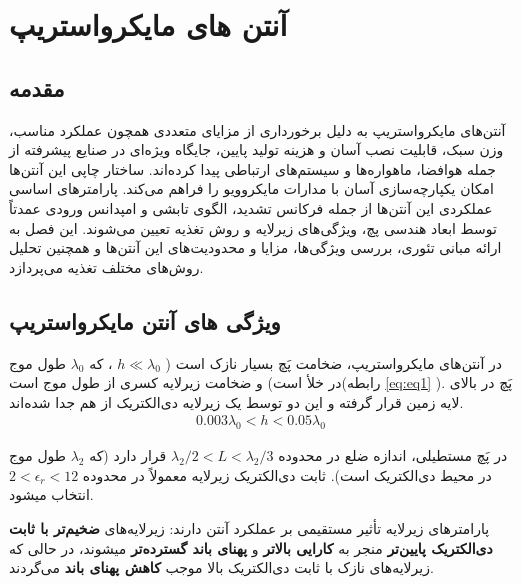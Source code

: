 \newpage 
\chapter{ آنتن های مایکرواستریپ}
\label{ch:1}

\section{مقدمه}
آنتن‌های مایکرواستریپ به دلیل برخورداری از مزایای متعددی همچون عملکرد مناسب، وزن سبک، قابلیت نصب آسان و هزینه تولید پایین، جایگاه ویژه‌ای در صنایع پیشرفته از جمله هوافضا، ماهواره‌ها و سیستم‌های ارتباطی پیدا کرده‌اند. ساختار چاپی این آنتن‌ها امکان یکپارچه‌سازی آسان با مدارات مایکروویو را فراهم می‌کند. پارامترهای اساسی عملکردی این آنتن‌ها از جمله فرکانس تشدید، الگوی تابشی و امپدانس ورودی عمدتاً توسط ابعاد هندسی پچ، ویژگی‌های زیرلایه و روش تغذیه تعیین می‌شوند. این فصل به ارائه مبانی تئوری، بررسی ویژگی‌ها، مزایا و محدودیت‌های این آنتن‌ها و همچنین تحلیل روش‌های مختلف تغذیه می‌پردازد.
\section{ویژگی های آنتن مایکرواستریپ}


در آنتن‌های مایکرواستریپ، ضخامت پَچ
 بسیار نازک است (
$ h \ll \lambda_{0}$
، که 
$ \lambda_{0} $
 طول موج در خلأ است) و ضخامت زیرلایه
  کسری از طول موج است(رابطه 
 \eqref{eq:eq1}
 ). پَچ در بالای لایه زمین قرار گرفته و این دو توسط یک زیرلایه دی‌الکتریک از هم جدا شده‌اند. 
\begin{align}
	\label{eq:eq1}
	0.003\lambda_{0} < h < 0.05\lambda_{0}
\end{align}

در پَچ مستطیلی، اندازه ضلع
  در محدوده
$ \lambda_{2}/2 < L < \lambda_{2}/3$
    قرار دارد (که
$ \lambda_{2} $
      طول موج در محیط دی‌الکتریک است). ثابت دی‌الکتریک زیرلایه معمولاً در محدوده
$ 2 < \epsilon_r < 12$
        انتخاب میشود. 

پارامترهای زیرلایه تأثیر مستقیمی بر عملکرد آنتن دارند: زیرلایه‌های
\textbf{
 ضخیم‌تر با ثابت دی‌الکتریک پایین‌تر
}
  منجر به
\textbf{
کارایی بالاتر
} 
و
\textbf{
پهنای باند گسترده‌تر
}
میشوند، در حالی که زیرلایه‌های نازک با ثابت دی‌الکتریک بالا موجب
\textbf{
کاهش پهنای باند
}
می‌گردند.


